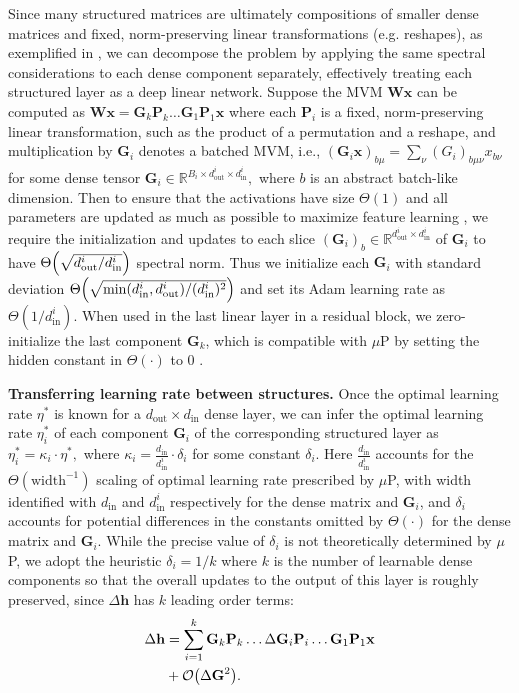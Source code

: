 \documentclass{article}
\newcommand{\mbf}[1]{{\boldsymbol{\mathbf{#1}}}}
\newcommand{\bm}{\mbf}
\theoremstyle{plain}
\theoremstyle{definition}
\theoremstyle{remark}
\newcommand{\mup}{$\mu$P\xspace}
\newcommand{\R}{\mathbb{R}}
\newcommand{\din}{{d_\mathrm{in}}}
\newcommand{\dout}{{d_\mathrm{out}}}
\begin{document}
Since many structured matrices are ultimately compositions of smaller dense matrices and fixed, norm-preserving linear transformations (e.g. reshapes), as exemplified in , we can decompose the problem by applying the same spectral considerations to each dense component separately, effectively treating each structured layer as a deep linear network. Suppose the MVM $\bm{W}\bm{x}$ can be computed as $\bm{W} \bm{x} = \bm{G}_k \bm{P}_{k} \ldots \bm{G}_1 \bm{P}_1 \bm{x}$ where each $\bm{P}_i$ is a fixed, norm-preserving linear transformation, such as the product of a permutation and a reshape,
and multiplication by $\bm{G}_i$ denotes a batched MVM, i.e.,
$(\bm{G}_i \bm{x})_{b \mu} = \sum_{\nu} (G_i)_{b\mu\nu} x_{b\nu}$ for some dense tensor $\bm{G}_{i} \in \R^{B_i \times d_{\mathrm{out}}^{i} \times d_{\mathrm{in}}^{i}},$ where $b$ is an abstract batch-like dimension.
Then to ensure that the activations have size $\Theta(1)$ and all parameters are updated as much as possible to maximize feature learning \citep{yang2023spectral}, we require the initialization and updates to each slice $(\bm{G}_i)_b \in \R^{d_{\mathrm{out}}^{i} \times d_{\mathrm{in}}^{i}}$ of
$\bm{G}_i$ to have $\Theta\Bigl(\sqrt{d_{\mathrm{out}}^{i} / d_{\mathrm{in}}^{i}}\Bigr)$ spectral norm.
Thus we initialize each $\bm{G}_i$ with standard deviation
$\Theta\Bigl( \sqrt{\min(d_{\mathrm{in}}^{i}, d_{\mathrm{out}}^{i}) / (d_{\mathrm{in}}^{i})^{2}} \Bigr)$
and set its Adam learning rate as $\Theta\left(1 / d_{\mathrm{in}}^{i}\right)$. When used in the last linear layer in a residual block, we zero-initialize the last component $\bm{G}_{k}$, which is compatible with \mup by setting the hidden constant in $\Theta(\cdot)$ to 0 \citep{yang2021v}.

\noindent \textbf{Transferring learning rate between structures.} \quad Once the optimal learning rate $\eta^*$ is known for a $\dout \times \din$ dense layer, we can infer the optimal learning rate $\eta_i^*$ of each component $\bm{G}_i$ of the corresponding structured layer as $\eta_i^* = \kappa_i \cdot \eta^*,$ where $\kappa_i = \frac{\din}{d_{\mathrm{in}}^{i}} \cdot \delta_i$ for some constant $\delta_i.$ Here $\frac{\din}{d_{\mathrm{in}}^{i}}$ accounts for the $\Theta(\mathrm{width}^{-1})$ scaling of optimal learning rate prescribed by \mup, with width identified with $\din$ and $d_{\mathrm{in}}^{i}$ respectively for the dense matrix and $\bm{G}_i$, and $\delta_i$ accounts for potential differences in the constants omitted by $\Theta(\cdot)$ for the dense matrix and $\bm{G}_i$. While the precise value of $\delta_i$ is not theoretically determined by \mup, we adopt the heuristic $\delta_i = 1/k$ where $k$ is the number of learnable dense components so that the overall updates to the output of this layer is roughly preserved, since $\Delta \bm{h}$ has $k$ leading order terms:
\begin{equation}
\begin{aligned}
    \Delta \bm{h} &= \sum_{i=1}^{k} \bm{G}_k \bm{P}_{k} \ldots
\Delta \bm{G}_i \bm{P}_{i} \ldots \bm{G}_1 \bm{P}_1 \bm{x} \\
 & + \order{\Delta \bm{G}^2}.
\end{aligned}
\end{equation}
\end{document}
